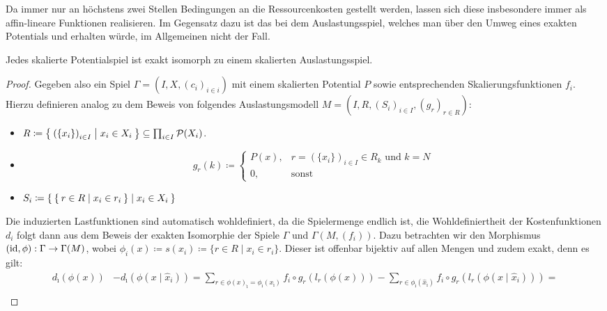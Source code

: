 \begin{bem}
	Da immer nur an höchstens zwei Stellen Bedingungen an die Ressourcenkosten gestellt werden, lassen sich diese insbesondere immer als affin-lineare Funktionen realisieren. Im Gegensatz dazu ist das bei dem Auslastungsspiel, welches man über den Umweg eines exakten Potentials und  erhalten würde, im Allgemeinen nicht der Fall.
\end{bem}

\begin{satz}
	Jedes skalierte Potentialspiel ist exakt isomorph zu einem skalierten Auslastungsspiel.
\end{satz}

\begin{proof}
	Gegeben also ein Spiel $\Gamma = (I, X, (c_i)_{i\in i})$ mit einem skalierten Potential $P$ sowie entsprechenden Skalierungsfunktionen $f_i$. Hierzu definieren analog zu dem Beweis von  folgendes Auslastungsmodell $M = (I, R, (S_i)_{i \in I}, (g_r)_{r \in R})$:
	\begin{itemize}
		\item $R \coloneqq \Set{\left(\{x_i\}\right)_{i \in I} | x_i \in X_i } \subseteq \prod_{i \in I}\mathcal{P}(X_i)$.
		\item \[g_r(k) \coloneqq 
		\begin{cases}
		P(x), 					&r = \left(\{x_i\}\right)_{i \in I} \in R_k 													\text{ und } k=N \\
		0,						&\text{sonst}
		\end{cases}\]
		\item $S_i \coloneqq \Set{ \Set{r \in R | x_i \in r_i} | x_i \in X_i }$
	\end{itemize}
	Die induzierten Lastfunktionen sind automatisch wohldefiniert, da die Spielermenge endlich ist, die Wohldefiniertheit der Kostenfunktionen $d_i$ folgt dann aus dem Beweis der exakten Isomorphie der Spiele $\Gamma$ und $\Gamma(M, (f_i))$. Dazu betrachten wir den Morphismus $(\mathrm{id}, \phi): \Gamma \to \Gamma(M)$, wobei $\phi_i(x) \coloneqq s(x_i) \coloneqq \{r \in R \mid x_i \in r_i\}$. Dieser ist offenbar bijektiv auf allen Mengen und zudem exakt, denn es gilt:
	\begin{align*}
	d_{\hat{\imath}}(\phi(x)) &- d_{\hat{\imath}}(\phi(x \mid \hat{x}_i)) =\sum_{r \in \phi(x)_{\hat{\imath}} = \phi_{\hat{\imath}}(x_{\hat{\imath}})} f_i \circ g_r(l_r(\phi(x))) - \sum_{r \in \phi_{\hat{\imath}}(\hat{x}_{\hat{\imath}})} f_i \circ g_r(l_r(\phi(x \mid \hat{x}_i))) = \\

\end{align*}
\end{proof}
